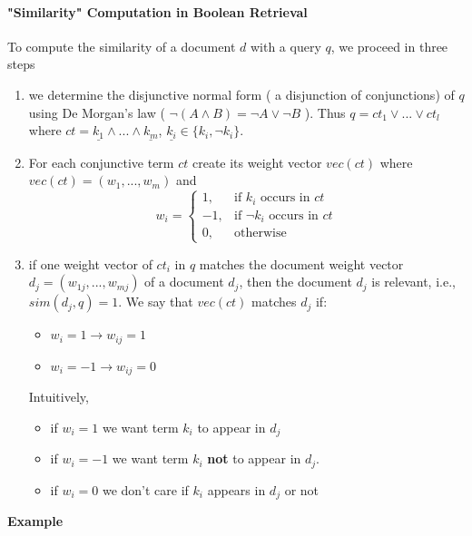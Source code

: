 \paragraph{"Similarity" Computation in Boolean Retrieval}

To compute the similarity of a document $d$ with a query $q$, we proceed in three steps
\begin{enumerate}
\item we determine the disjunctive normal form ( a disjunction of conjunctions) of $q$ using De Morgan's law ( $\neg( A \land B )= \neg A \lor \neg B$ ). Thus $q = ct_1 \lor ... \lor ct_l$ where $ct= \underline{k_1} \land ... \land \underline{k_m}$, $\underline{k_i} \in \{k_i, \neg k_i\}$.
\item For each conjunctive term $ct$ create its weight vector $vec(ct)$ where $vec(ct)=(w_1,...,w_m)$ and 
\begin{equation*}
w_i = \begin{cases}
	1, & \text{if } k_i \text{ occurs in } ct \\
	-1, & \text{if } \neg k_i \text{ occurs in } ct \\
	0, & \text{otherwise}
	\end{cases}
\end{equation*}

\item if one weight vector of $ct_i$ in $q$ matches the document weight vector $d_j = (w_{1j},...,w_{mj})$ of a document $d_j$, then the document $d_j$ is relevant, i.e., $sim(d_j,q)=1$. We say that $vec(ct)$ matches $d_j$ if: 
\begin{itemize}
\item $w_i = 1 \rightarrow w_{ij} = 1$
\item $w_i = -1 \rightarrow w_{ij} = 0$

\end{itemize}
Intuitively, 
\begin{itemize}
\item if $w_i = 1$ we want term $k_i$ to appear in $d_j$
\item if $w_i=-1$ we want term $k_i$ \textbf{not} to appear in $d_j$.
\item if $w_i = 0$ we don't care if $k_i$ appears in $d_j$ or not
 \end{itemize} 
\end{enumerate} 
\textbf{Example}


